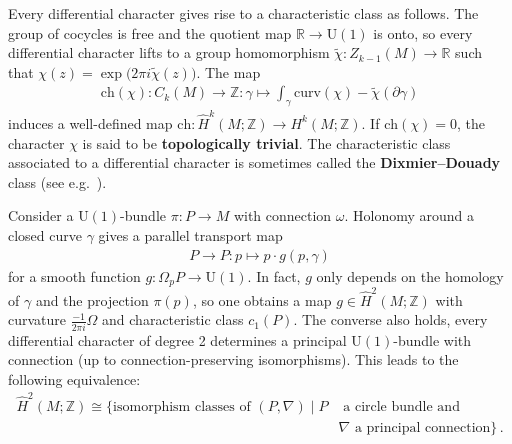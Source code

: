     \begin{property}\label{bundle:characteristic_class}
        Every differential character gives rise to a characteristic class as follows. The group of cocycles is free and the quotient map $\mathbb{R}\rightarrow\mathrm{U}(1)$ is onto, so every differential character lifts to a group homomorphism $\widetilde{\chi}:Z_{k-1}(M)\rightarrow\mathbb{R}$ such that $\chi(z)=\exp\big(2\pi i\widetilde{\chi}(z)\big)$. The map
        \begin{gather}
            \mathrm{ch}(\chi):C_k(M)\rightarrow\mathbb{Z}:\gamma\mapsto\int_\gamma\mathrm{curv}(\chi)-\widetilde{\chi}(\partial\gamma)
        \end{gather}
        induces a well-defined map $\mathrm{ch}:\hat{H}^k(M;\mathbb{Z})\rightarrow H^k(M;\mathbb{Z})$. If $\mathrm{ch}(\chi)=0$, the character $\chi$ is said to be \textbf{topologically trivial}. The characteristic class associated to a differential character is sometimes called the \textbf{Dixmier--Douady} class (see e.g.~\citet{brylinski_loop_1993}).
    \end{property}

    \begin{example}
        Consider a $\mathrm{U}(1)$-bundle $\pi:P\rightarrow M$ with connection $\omega$. Holonomy around a closed curve $\gamma$ gives a parallel transport map
        \begin{gather}
            P\rightarrow P:p\mapsto p\cdot g(p,\gamma)
        \end{gather}
        for a smooth function $g:\Omega_p P\rightarrow\mathrm{U}(1)$. In fact, $g$ only depends on the homology of $\gamma$ and the projection $\pi(p)$, so one obtains a map $g\in\hat{H}^2(M;\mathbb{Z})$ with curvature $\frac{-1}{2\pi i}\Omega$ and characteristic class $c_1(P)$. The converse also holds, every differential character of degree 2 determines a principal $\mathrm{U}(1)$-bundle with connection (up to connection-preserving isomorphisms). This leads to the following equivalence:
        \begin{align}
            \hat{H}^2(M;\mathbb{Z})\cong\{\text{isomorphism classes of }(P,\nabla)\mid P&\text{ a circle bundle and }\\
            &\nabla\text{ a principal connection}\}\,.\nonumber
        \end{align}
    \end{example}

